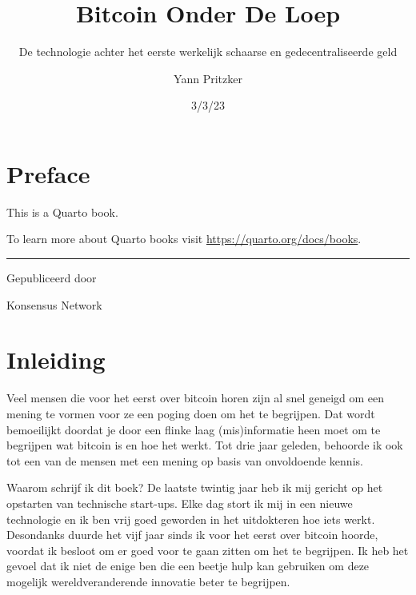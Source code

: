 \documentclass[
  letterpaper,
]{scrbook}
\title{Bitcoin Onder De Loep}
\subtitle{De technologie achter het eerste werkelijk schaarse en
gedecentraliseerde geld}
\author{Yann Pritzker}
\date{3/3/23}
\renewcommand*\contentsname{Table of contents}
\newcommand\contentsname{Table of contents}
\begin{document}
\frontmatter
\maketitle
\ifdefined\Shaded\renewenvironment{Shaded}{\begin{tcolorbox}[frame hidden, enhanced, interior hidden, sharp corners, borderline west={3pt}{0pt}{shadecolor}, breakable, boxrule=0pt]}{\end{tcolorbox}}\fi

\renewcommand*\contentsname{Inhoudsopgave}
{
\hypersetup{linkcolor=}
\setcounter{tocdepth}{2}
\tableofcontents
}
\mainmatter
{}

\hypertarget{preface}{%
\chapter*{Preface}\label{preface}}


This is a Quarto book.

To learn more about Quarto books visit
\url{https://quarto.org/docs/books}.

\begin{center}\rule{0.5\linewidth}{0.5pt}\end{center}

Gepubliceerd door

Konsensus Network


\hypertarget{inleiding}{%
\chapter{Inleiding}\label{inleiding}}

Veel mensen die voor het eerst over bitcoin horen zijn al snel geneigd
om een mening te vormen voor ze een poging doen om het te begrijpen. Dat
wordt bemoeilijkt doordat je door een flinke laag (mis)informatie heen
moet om te begrijpen wat bitcoin is en hoe het werkt. Tot drie jaar
geleden, behoorde ik ook tot een van de mensen met een mening op basis
van onvoldoende kennis.

Waarom schrijf ik dit boek? De laatste twintig jaar heb ik mij gericht
op het opstarten van technische start-ups. Elke dag stort ik mij in een
nieuwe technologie en ik ben vrij goed geworden in het uitdokteren hoe
iets werkt. Desondanks duurde het vijf jaar sinds ik voor het eerst over
bitcoin hoorde, voordat ik besloot om er goed voor te gaan zitten om het
te begrijpen. Ik heb het gevoel dat ik niet de enige ben die een beetje
hulp kan gebruiken om deze mogelijk wereldveranderende innovatie beter
te begrijpen.
\end{document}
